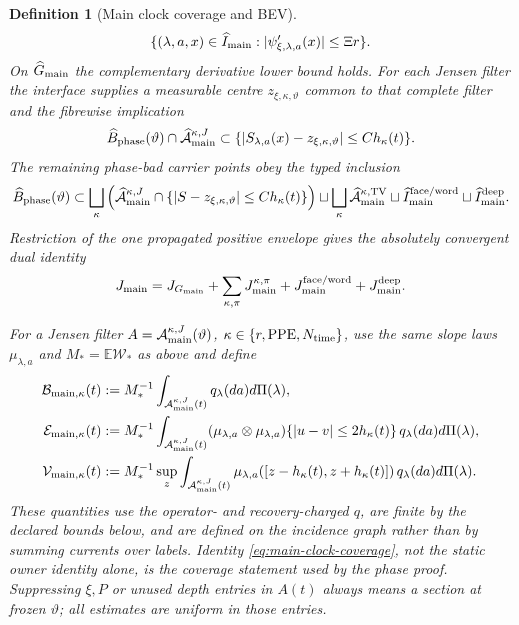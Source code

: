 \documentclass[11pt]{article}
\newtheorem{definition}[theorem]{Definition}
\begin{document}
\begin{definition}[Main clock coverage and BEV]
\[ \{(\lambda,a,x)\in\widehat I_{\rm main}:
   |\psi'_{\xi,\lambda,a}(x)|\le \Xi r\}.
\]
On $\widehat G_{\rm main}$ the complementary derivative lower bound holds.
For each Jensen filter the interface supplies a measurable centre
$z_{\xi,\kappa,\vartheta}$ common to that complete filter and the fibrewise
implication
\[
 \widehat B_{\rm phase}(\vartheta)\cap
 \widehat{\mathcal A}_{\rm main}^{\kappa,J}
 \subset
 \{|S_{\lambda,a}(x)-z_{\xi,\kappa,\vartheta}|
          \le C h_\kappa(t)\}.
\]
The remaining phase-bad carrier points obey the typed inclusion
\begin{equation}
\label{eq:main-phase-bad-coverage}
 \widehat B_{\rm phase}(\vartheta)
 \subset
 \bigsqcup_{\kappa}
   \left(\widehat{\mathcal A}_{\rm main}^{\kappa,J}
       \cap\{|S-z_{\xi,\kappa,\vartheta}|\le Ch_\kappa(t)\}\right)
 \sqcup\bigsqcup_{\kappa}
   \widehat{\mathcal A}_{\rm main}^{\kappa,\rm TV}
 \sqcup\widehat I_{\rm main}^{\rm face/word}
 \sqcup\widehat I_{\rm main}^{\rm deep}.
\end{equation}
Restriction of the one propagated positive envelope gives the absolutely
convergent dual identity
\begin{equation}
\label{eq:main-clock-current-identity}
 J_{\rm main}=J_{G_{\rm main}}
 +\sum_{\kappa,\pi}J_{\rm main}^{\kappa,\pi}
 +J_{\rm main}^{\rm face/word}+J_{\rm main}^{\rm deep}.
\end{equation}

For a Jensen filter $A=\mathcal A_{\rm main}^{\kappa,J}(\vartheta)$,
$\kappa\in\{r,{\rm PPE},N_{\rm time}\}$, use the same slope laws
$\mu_{\lambda,a}$ and $M_*=\mathbb E\mathscr W_*$ as above and define
\begin{align}
 \mathcal B_{{\rm main},\kappa}(t)&:=M_*^{-1}
  \int_{\mathcal A_{\rm main}^{\kappa,J}(t)}q_\lambda(da)d\Pi(\lambda),
  \notag\\
 \mathcal E_{{\rm main},\kappa}(t)&:=M_*^{-1}
  \int_{\mathcal A_{\rm main}^{\kappa,J}(t)}
  (\mu_{\lambda,a}\otimes\mu_{\lambda,a})
  \{|u-v|\le2h_\kappa(t)\}\,q_\lambda(da)d\Pi(\lambda),
  \notag\\
 \mathcal V_{{\rm main},\kappa}(t)&:=M_*^{-1}\sup_z
  \int_{\mathcal A_{\rm main}^{\kappa,J}(t)}
  \mu_{\lambda,a}([z-h_\kappa(t),z+h_\kappa(t)])
  \,q_\lambda(da)d\Pi(\lambda).
 \label{eq:main-source-BEV}
\end{align}
These quantities use the operator- and recovery-charged $q$, are finite by
the declared bounds below, and are defined on the incidence graph rather
than by summing currents over labels.  Identity
\eqref{eq:main-clock-coverage}, not the static owner identity alone, is the
coverage statement used by the phase proof.  Suppressing $\xi,P$ or unused
depth entries in $A(t)$ always means a section at frozen $\vartheta$; all
estimates are uniform in those entries.
\end{definition}
\end{document}
